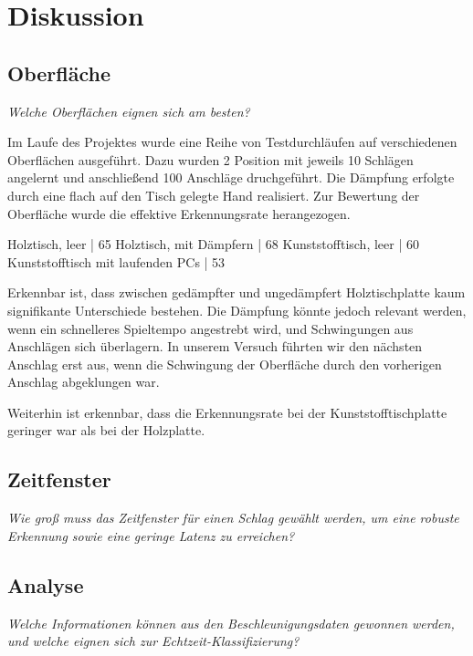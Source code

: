 \section{Diskussion}
\subsection{Oberfläche}
\textit{Welche Oberflächen eignen sich am besten?}

Im Laufe des Projektes wurde eine Reihe von Testdurchläufen auf verschiedenen Oberflächen ausgeführt. Dazu wurden 2 Position mit jeweils 10 Schlägen angelernt und anschließend 100 Anschläge druchgeführt. Die Dämpfung erfolgte durch eine flach auf den Tisch gelegte Hand realisiert. Zur Bewertung der Oberfläche wurde die effektive Erkennungsrate herangezogen.

Holztisch, leer | 65%
Holztisch, mit Dämpfern | 68%
Kunststofftisch, leer | 60%
Kunststofftisch mit laufenden PCs | 53%

Erkennbar ist, dass zwischen gedämpfter und ungedämpfert Holztischplatte kaum signifikante Unterschiede bestehen. Die Dämpfung könnte jedoch relevant werden, wenn ein schnelleres Spieltempo angestrebt wird, und Schwingungen aus Anschlägen sich überlagern. In unserem Versuch führten wir den nächsten Anschlag erst aus, wenn die Schwingung der Oberfläche durch den vorherigen Anschlag abgeklungen war.

Weiterhin ist erkennbar, dass die Erkennungsrate bei der Kunststofftischplatte geringer war als bei der Holzplatte.


\subsection{Zeitfenster}
\textit{Wie groß muss das Zeitfenster für einen Schlag gewählt werden, um eine robuste Erkennung sowie eine geringe Latenz zu erreichen?}



\subsection{Analyse}
\textit{Welche Informationen können aus den Beschleunigungsdaten gewonnen werden, und welche eignen sich zur Echtzeit-Klassifizierung?}


